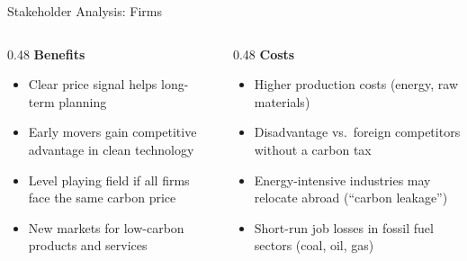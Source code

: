 \documentclass[9pt,english,aspectratio=169]{beamer}
\begin{document}
\begin{frame}{Stakeholder Analysis: Firms}

  \begin{columns}[T]
    \begin{column}{0.48\textwidth}
      \textbf{\textcolor{green!60!black}{Benefits}}
      \begin{itemize}\small
        \item Clear price signal helps long-term planning
        \item Early movers gain competitive advantage in clean technology
        \item Level playing field if all firms face the same carbon price
        \item New markets for low-carbon products and services
      \end{itemize}
    \end{column}
    \begin{column}{0.48\textwidth}
      \textbf{\textcolor{vermillion}{Costs}}
      \begin{itemize}\small
        \item Higher production costs (energy, raw materials)
        \item Disadvantage vs.\ foreign competitors without a carbon tax
        \item Energy-intensive industries may relocate abroad (``carbon leakage'')
        \item Short-run job losses in fossil fuel sectors (coal, oil, gas)
      \end{itemize}
    \end{column}
  \end{columns}

\end{frame}
\end{document}
